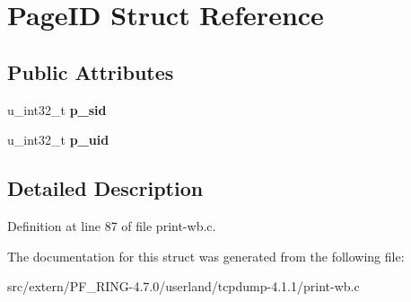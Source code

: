 \hypertarget{struct_page_i_d}{
\section{PageID Struct Reference}
\label{struct_page_i_d}
}
\subsection*{Public Attributes}
\begin{DoxyCompactItemize}
\item 
\hypertarget{struct_page_i_d_aba2fbf094bd34e67a1321497870f5b2d}{
u\_\-int32\_\-t {\bfseries p\_\-sid}}
\label{struct_page_i_d_aba2fbf094bd34e67a1321497870f5b2d}

\item 
\hypertarget{struct_page_i_d_acd63566f8f1724a854df2238eed073e2}{
u\_\-int32\_\-t {\bfseries p\_\-uid}}
\label{struct_page_i_d_acd63566f8f1724a854df2238eed073e2}

\end{DoxyCompactItemize}


\subsection{Detailed Description}


Definition at line 87 of file print-\/wb.c.



The documentation for this struct was generated from the following file:\begin{DoxyCompactItemize}
\item 
src/extern/PF\_\-RING-\/4.7.0/userland/tcpdump-\/4.1.1/print-\/wb.c\end{DoxyCompactItemize}
